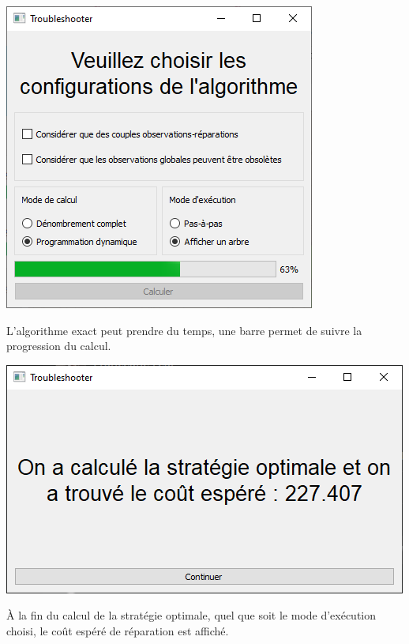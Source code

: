 \documentclass[a4paper,11pt]{article}
\theoremstyle{plain}
\theoremstyle{definition}
\begin{document}
\begin{center}
\includegraphics[scale=0.667]{Figures/exato_2}
\end{center}
L'algorithme exact peut prendre du temps, une barre permet de suivre la progression du calcul.

\begin{center}
\includegraphics[scale=0.667]{Figures/exato_3_arvore1}
\end{center}
À la fin du calcul de la stratégie optimale, quel que soit le mode d'exécution choisi, le coût espéré de réparation est affiché.

\clearpage
\end{document}
